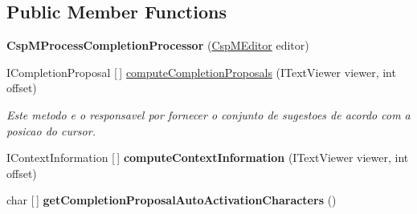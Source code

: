 \subsection*{Public Member Functions}
\begin{DoxyCompactItemize}
\item 
\mbox{\label{classcom_1_1fware_1_1cspdt_1_1cspm_1_1editor_1_1config_1_1_csp_m_process_completion_processor_a06f6b7e4ce46fbb8ea109eb8e3e3c973}} 
{\bfseries Csp\+M\+Process\+Completion\+Processor} (\hyperlink{classcom_1_1fware_1_1cspdt_1_1cspm_1_1editor_1_1_csp_m_editor}{Csp\+M\+Editor} editor)
\item 
\mbox{\label{classcom_1_1fware_1_1cspdt_1_1cspm_1_1editor_1_1config_1_1_csp_m_process_completion_processor_a92f2e4e1f8cb6585cd7d779bceb4afbe}} 
I\+Completion\+Proposal \mbox{[}$\,$\mbox{]} \hyperlink{classcom_1_1fware_1_1cspdt_1_1cspm_1_1editor_1_1config_1_1_csp_m_process_completion_processor_a92f2e4e1f8cb6585cd7d779bceb4afbe}{compute\+Completion\+Proposals} (I\+Text\+Viewer viewer, int offset)
\begin{DoxyCompactList}\small\item\em Este metodo e o responsavel por fornecer o conjunto de sugestoes de acordo com a posicao do cursor. \end{DoxyCompactList}\item 
\mbox{\label{classcom_1_1fware_1_1cspdt_1_1cspm_1_1editor_1_1config_1_1_csp_m_process_completion_processor_aeb2234d9b3f0ba22cfb09220352218de}} 
I\+Context\+Information \mbox{[}$\,$\mbox{]} {\bfseries compute\+Context\+Information} (I\+Text\+Viewer viewer, int offset)
\item 
\mbox{\label{classcom_1_1fware_1_1cspdt_1_1cspm_1_1editor_1_1config_1_1_csp_m_process_completion_processor_a3a7bfa456d6fbaf9e9e71fa9cd6c8f6e}} 
char \mbox{[}$\,$\mbox{]} {\bfseries get\+Completion\+Proposal\+Auto\+Activation\+Characters} ()
\item 
\mbox{\label{classcom_1_1fware_1_1cspdt_1_1cspm_1_1editor_1_1config_1_1_csp_m_process_completion_processor_a04c78632c12d2fa79b9986b7a45e5530}} 

\end{DoxyCompactItemize}
